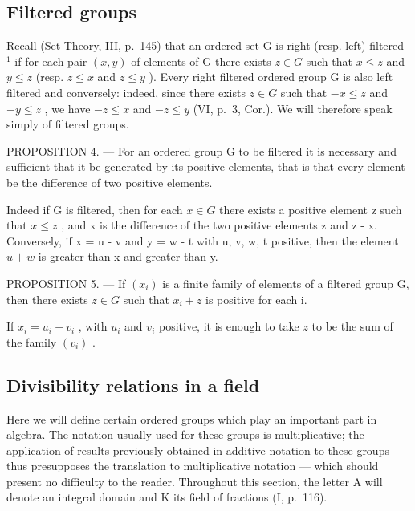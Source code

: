 \subsection{Filtered groups}

Recall (Set Theory, III, p.~145) that an ordered set G is right (resp. left) filtered \(^{1}\) if for each pair \((x, y)\) of elements of G there exists \(z \in G\) such that \(x \leqslant z\) and \(y \leqslant z\) (resp. \(z \leqslant x\) and \(z \leqslant y\) ). Every right filtered ordered group G is also left filtered and conversely: indeed, since there exists \(z \in G\) such that \(-x \leqslant z\) and \(-y \leqslant z\) , we have \(-z \leqslant x\) and \(-z \leqslant y\) (VI, p.~3, Cor.). We will therefore speak simply of filtered groups.

PROPOSITION 4. --- For an ordered group G to be filtered it is necessary and sufficient that it be generated by its positive elements, that is that every element be the difference of two positive elements.

Indeed if G is filtered, then for each \(x \in G\) there exists a positive element z such that \(x \leqslant z\) , and x is the difference of the two positive elements z and z - x. Conversely, if x = u - v and y = w - t with u, v, w, t positive, then the element \(u + w\) is greater than x and greater than y.

PROPOSITION 5. --- If \((x_i)\) is a finite family of elements of a filtered group G, then there exists \(z \in G\) such that \(x_i + z\) is positive for each i.

If \(x_{i} = u_{i} - v_{i}\) , with \(u_{i}\) and \(v_{i}\) positive, it is enough to take \(z\) to be the sum of the family \((v_{i})\) .

\subsection{Divisibility relations in a field}

Here we will define certain ordered groups which play an important part in algebra. The notation usually used for these groups is multiplicative; the application of results previously obtained in additive notation to these groups thus presupposes the translation to multiplicative notation --- which should present no difficulty to the reader. Throughout this section, the letter A will denote an integral domain and K its field of fractions (I, p.~116).


